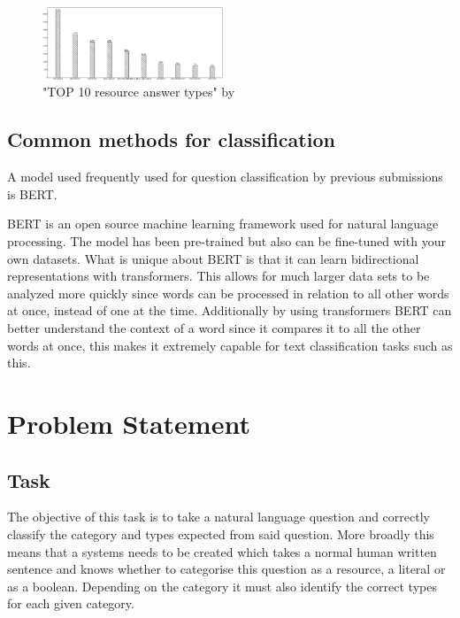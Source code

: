\documentclass[sigconf]{acmart}
\begin{document}
\begin{figure}[h]
    \includegraphics[width=0.48\textwidth]{figures/top10ResourceAnswerTypes.png}
    \caption{"TOP 10 resource answer types" by \citet{Kothen:analysis}}
    \label{figure:top10resourceanswertypes}
\end{figure}

\subsection{Common methods for classification}
A model used frequently used for question classification by previous submissions is \gls{BERT}\cite{maastricht:bert, heraklion:bert, tokyo:bert, uis:bert, Kothen:analysis}. 

\gls{BERT} is an open source machine learning framework used for natural language processing. The model has been pre-trained but also can be fine-tuned with your own datasets. What is unique about BERT is that it can learn bidirectional representations with transformers. This allows for much larger data sets to be analyzed more quickly since words can be processed in relation to all other words at once, instead of one at the time. Additionally by using transformers \gls{BERT} can better understand the context of a word since it compares it to all the other words at once, this makes it extremely capable for text classification tasks such as this.\cite{nvidia:bert}



\section{Problem Statement}
\subsection{Task}
The objective of this task is to take a natural language question and correctly classify the category and types expected from said question. More broadly this means that a systems needs to be created which takes a normal human written sentence and knows whether to categorise this question as a resource, a literal or as a boolean. Depending on the category it must also identify the correct types for each given category. 
\end{document}
